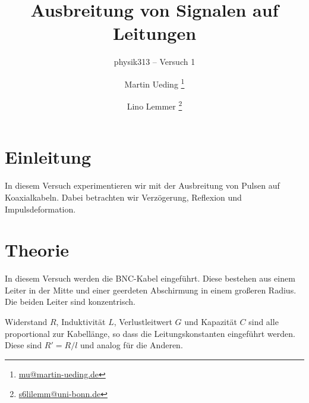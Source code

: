




\subject{Praktikumsprotokoll}
\title{Ausbreitung von Signalen auf Leitungen}
\subtitle{physik313 – Versuch 1}
\author{
	Martin Ueding \footnote{\href{mailto:mu@martin-ueding.de}{mu@martin-ueding.de}}
	\and
	Lino Lemmer \footnote{\href{mailto:s6lilemm@uni-bonn.de}{s6lilemm@uni-bonn.de}}
}



\maketitle

\tableofcontents
\newpage


\section{Einleitung}

In diesem Versuch experimentieren wir mit der Ausbreitung von Pulsen auf
Koaxialkabeln. Dabei betrachten wir Verzögerung, Reflexion und
Impulsdeformation.


\newcommand\Uh{U_\text h}
\newcommand\Ur{U_\text r}

\section{Theorie}

In diesem Versuch werden die BNC-Kabel eingeführt. Diese bestehen aus einem
Leiter in der Mitte und einer geerdeten Abschirmung in einem großeren Radius.
Die beiden Leiter sind konzentrisch.

Widerstand $R$, Induktivität $L$, Verlustleitwert $G$ und Kapazität $C$ sind
alle proportional zur Kabellänge, so dass die Leitungskonstanten eingeführt
werden. Diese sind $R' = R/l$ und analog für die Anderen.

